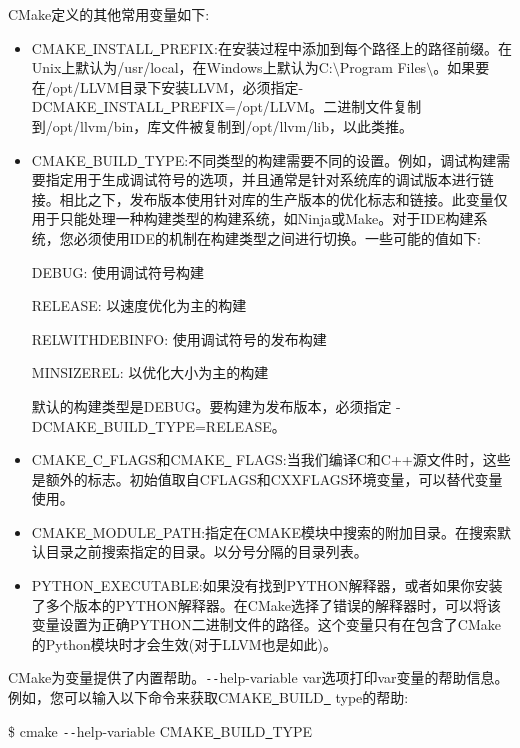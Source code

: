 CMake定义的其他常用变量如下:\par

\begin{itemize}
	\item CMAKE\underline{~}INSTALL\underline{~}PREFIX:在安装过程中添加到每个路径上的路径前缀。在Unix上默认为/usr/local，在Windows上默认为C:$\setminus$Program Files$\setminus$。如果要在/opt/LLVM目录下安装LLVM，必须指定-DCMAKE\underline{~}INSTALL\underline{~}PREFIX=/opt/LLVM。二进制文件复制到/opt/llvm/bin，库文件被复制到/opt/llvm/lib，以此类推。
	\item CMAKE\underline{~}BUILD\underline{~}TYPE:不同类型的构建需要不同的设置。例如，调试构建需要指定用于生成调试符号的选项，并且通常是针对系统库的调试版本进行链接。相比之下，发布版本使用针对库的生产版本的优化标志和链接。此变量仅用于只能处理一种构建类型的构建系统，如Ninja或Make。对于IDE构建系统，您必须使用IDE的机制在构建类型之间进行切换。一些可能的值如下:\par
	DEBUG: 使用调试符号构建\par
	RELEASE: 以速度优化为主的构建\par
	RELWITHDEBINFO: 使用调试符号的发布构建\par
	MINSIZEREL: 以优化大小为主的构建\par
	默认的构建类型是DEBUG。要构建为发布版本，必须指定 -DCMAKE\underline{~}BUILD\underline{~}TYPE=RELE\allowbreak ASE。\par
	\item CMAKE\underline{~}C\underline{~}FLAGS和CMAKE\underline{~} FLAGS:当我们编译C和C++源文件时，这些是额外的标志。初始值取自CFLAGS和CXXFLAGS环境变量，可以替代变量使用。
	\item CMAKE\underline{~}MODULE\underline{~}PATH:指定在CMAKE模块中搜索的附加目录。在搜索默认目录之前搜索指定的目录。以分号分隔的目录列表。
	\item PYTHON\underline{~}EXECUTABLE:如果没有找到PYTHON解释器，或者如果你安装了多个版本的PYTHON解释器。在CMake选择了错误的解释器时，可以将该变量设置为正确PYTHON二进制文件的路径。这个变量只有在包含了CMake的Python模块时才会生效(对于LLVM也是如此)。
\end{itemize}

CMake为变量提供了内置帮助。\verb|--|help-variable var选项打印var变量的帮助信息。例如，您可以输入以下命令来获取CMAKE\underline{~}BUILD\underline{~} type的帮助:\par

\begin{tcolorbox}[colback=white,colframe=black]
	\$ cmake \verb|--|help-variable CMAKE\underline{~}BUILD\underline{~}TYPE
\end{tcolorbox}

